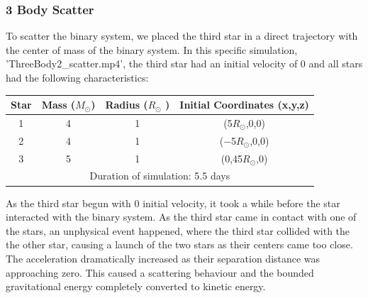 \documentclass[10pt,letterpaper]{article}
\begin{document}
\subsubsection{3 Body Scatter}
To scatter the binary system, we placed the third star in a direct trajectory with the center of mass of the binary system. In this specific simulation, 'ThreeBody2\_scatter.mp4', the third star had an initial velocity of 0 and all stars had the following characteristics:
\begin{table}[!htb]
\centering
\begin{tabular}{| c | c | c | c |}
\hline
Star & Mass ($M_{\odot}$) & Radius ($R_{\odot}$ ) & Initial Coordinates (x,y,z)\\
\hline
1 & 4 & 1 & (5$R_{\odot}$,0,0) \\
\hline
2 & 4 & 1 & ($-$5$R_{\odot}$,0,0) \\
\hline 
3 & 5 & 1 & (0,45$R_{\odot}$,0) \\
\hline
\multicolumn{4}{|c|}{Duration of simulation: 5.5 days} \\
\hline
\end{tabular}
\end{table}
As the third star begun with 0 initial velocity, it took a while before the star interacted with the binary system. As the third star came in contact with one of the stars, an unphysical event happened, where the third star collided with the the other star, causing a launch of the two stars as their centers came too close. The acceleration dramatically increased as their separation distance was approaching zero. This caused a scattering behaviour and the bounded gravitational energy completely converted to kinetic energy.
\end{document}
